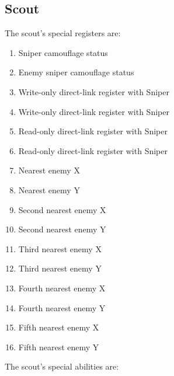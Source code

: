 \documentclass{article}
\begin{document}
\subsection*{Scout}

The scout's special registers are:

\begin{enumerate}[noitemsep]
    \item Sniper camouflage status
    \item Enemy sniper camouflage status
    \item Write-only direct-link register with Sniper
    \item Write-only direct-link register with Sniper
    \item Read-only direct-link register with Sniper
    \item Read-only direct-link register with Sniper
    \item Nearest enemy X
    \item Nearest enemy Y
    \item Second nearest enemy X
    \item Second nearest enemy Y
    \item Third nearest enemy X
    \item Third nearest enemy Y
    \item Fourth nearest enemy X
    \item Fourth nearest enemy Y
    \item Fifth nearest enemy X
    \item Fifth nearest enemy Y
\end{enumerate}

The scout's special abilities are:
\end{document}
